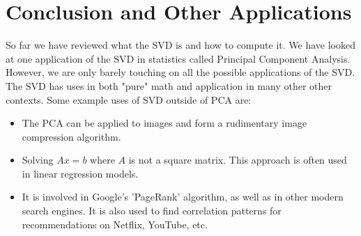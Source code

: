 \documentclass{article}
\begin{document}
\section{Conclusion and Other Applications}
So far we have reviewed what the SVD is and how to compute it. We have looked at one application of the SVD in statistics called Principal Component Analysis. However, we are only barely touching on all the possible applications of the SVD. The SVD has uses in both "pure" math and application in many other other contexts. Some example uses of SVD outside of PCA are:
\begin{itemize}
  \item The PCA can be applied to images and form a rudimentary image compression algorithm.
  \item Solving $Ax = b$ where $A$ is not a square matrix. This approach is often used in linear regression models.
  \item It is involved in Google's 'PageRank' algorithm, as well as in other modern search engines. It is also used to find correlation patterns for recommendations on Netflix, YouTube, etc.
\end{itemize}
\end{document}
